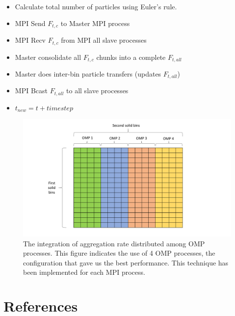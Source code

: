 \documentclass[preprint,11pt,authoryear]{elsarticle}
\begin{document}
\begin{algorithm}[H]
\begin{algorithmic}[*]
\EndFor
\begin{itemize}[noitemsep,nolistsep,itemindent=20pt]
\item  Calculate total number of particles using Euler's rule. 
\end{itemize}

\EndFor
\begin{itemize}[noitemsep,nolistsep,itemindent=10pt]
\item MPI Send $F_{t,c}$ to Master MPI process
\item MPI Recv $F_{t,c}$ from MPI all slave processes
\item Master consolidate all $F_{t,c}$ chunks into a complete $F_{t,all}$
\item Master does inter-bin particle transfers (updates $F_{t,all}$)
\item MPI Bcast $F_{t,all}$ to all slave processes
\item $t_{new} = t + timestep$
\end{itemize}
\EndWhile   

\end{algorithmic}
\end{algorithm}  
 
\begin{figure}[H]
\centering
\includegraphics[scale=0.5]{OMP_table.pdf}
\caption{The integration of aggregation rate distributed among OMP processes. This figure indicates the use of 4 OMP processes, the 
configuration that gave us the best performance. This technique has been implemented for each MPI process.}
\label{fig:mthds_OMP_distribution}
\end{figure}	

\section*{References} 


\end{document}
